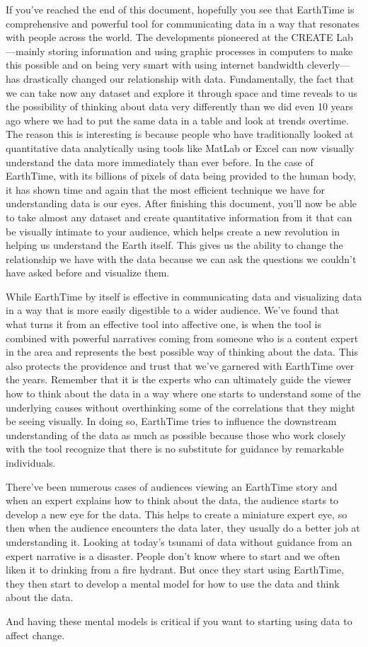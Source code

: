 \documentclass[
]{book}
\begin{document}
If you've reached the end of this document, hopefully you see that EarthTime is comprehensive and powerful tool for communicating data in a way that resonates with people across the world. The developments pioneered at the CREATE Lab---mainly storing information and using graphic processes in computers to make this possible and on being very smart with using internet bandwidth cleverly---has drastically changed our relationship with data. Fundamentally, the fact that we can take now any dataset and explore it through space and time reveals to us the possibility of thinking about data very differently than we did even 10 years ago where we had to put the same data in a table and look at trends overtime. The reason this is interesting is because people who have traditionally looked at quantitative data analytically using tools like MatLab or Excel can now visually understand the data more immediately than ever before. In the case of EarthTime, with its billions of pixels of data being provided to the human body, it has shown time and again that the most efficient technique we have for understanding data is our eyes. After finishing this document, you'll now be able to take almost any dataset and create quantitative information from it that can be visually intimate to your audience, which helps create a new revolution in helping us understand the Earth itself. This gives us the ability to change the relationship we have with the data because we can ask the questions we couldn't have asked before and visualize them.

While EarthTime by itself is effective in communicating data and visualizing data in a way that is more easily digestible to a wider audience. We've found that what turns it from an effective tool into affective one, is when the tool is combined with powerful narratives coming from someone who is a content expert in the area and represents the best possible way of thinking about the data. This also protects the providence and trust that we've garnered with EarthTime over the years. Remember that it is the experts who can ultimately guide the viewer how to think about the data in a way where one starts to understand some of the underlying causes without overthinking some of the correlations that they might be seeing visually. In doing so, EarthTime tries to influence the downstream understanding of the data as much as possible because those who work closely with the tool recognize that there is no substitute for guidance by remarkable individuals.

There've been numerous cases of audiences viewing an EarthTime story and when an expert explains how to think about the data, the audience starts to develop a new eye for the data. This helps to create a miniature expert eye, so then when the audience encounters the data later, they usually do a better job at understanding it. Looking at today's tsunami of data without guidance from an expert narrative is a disaster. People don't know where to start and we often liken it to drinking from a fire hydrant. But once they start using EarthTime, they then start to develop a mental model for how to use the data and think about the data.

And having these mental models is critical if you want to starting using data to affect change.

  

\backmatter
\printindex
\end{document}
